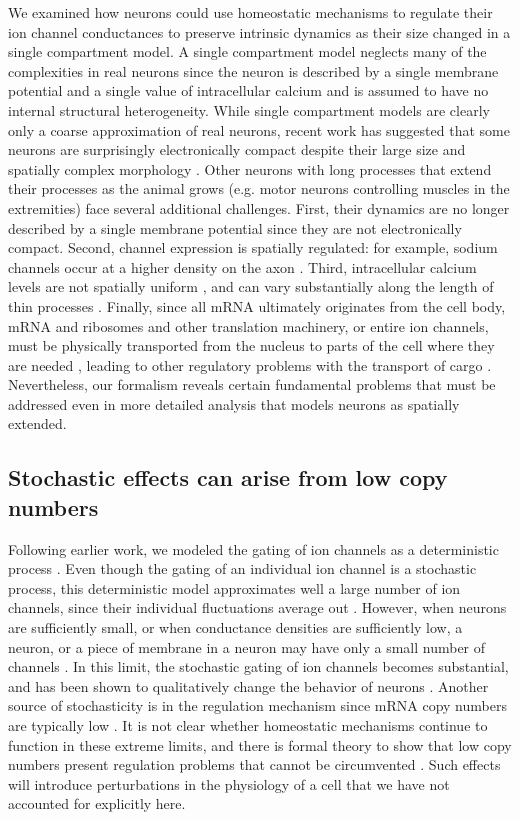 \documentclass[9pt,lineno]{elife}
\begin{document}
We examined how neurons could use homeostatic mechanisms to regulate their ion channel conductances to preserve intrinsic dynamics as their size changed in a single compartment model. A single compartment model neglects many of the complexities in real neurons since the neuron is described by a single membrane potential and a single value of intracellular calcium and is assumed to have no internal structural heterogeneity. While single compartment models are clearly only a coarse approximation of real neurons, recent work has suggested that some neurons are surprisingly electronically compact despite their large size and spatially complex morphology \citep{Otopalik:2017jr, Ray:2019fo}. Other neurons with long processes that extend their processes as the animal grows (e.g. motor neurons controlling muscles in the extremities) face several additional challenges. First, their dynamics are no longer described by a single membrane potential since they are not electronically compact. Second, channel expression is spatially regulated: for example, sodium channels occur at a higher density on the axon \citep{Kole:2008jv}. Third, intracellular calcium levels are not spatially uniform \citep{HernandezCruz:1990wv}, and can vary substantially along the length of thin processes \citep{Regehr:1994wg}. Finally, since all mRNA ultimately originates from the cell body, mRNA and ribosomes and other translation machinery, or entire ion channels, must be physically transported from the nucleus to parts of the cell where they are needed \citep{Doyle:2011be, Kosik:2016gs, Bramham:2007ii}, leading to other regulatory problems with the transport of cargo \citep{Doyle:2011be,Williams:2016cw}. Nevertheless, our formalism reveals certain fundamental problems that must be addressed even in more detailed analysis that models neurons as spatially extended.  


\subsection{Stochastic effects can arise from low copy numbers}
Following earlier work, we modeled the gating of ion channels as a deterministic process \citep{Hodgkin:1952gr}. Even though the gating of an individual ion channel is a stochastic process, this deterministic model approximates well a large number of ion channels, since their individual fluctuations average out  \citep{White:2000th}. However, when neurons are sufficiently small, or when conductance densities are sufficiently low, a neuron, or a piece of membrane in a neuron may have only a small number of channels \citep{Smith:2002cn}. In this limit, the stochastic gating of ion channels becomes substantial, and has been shown to qualitatively change the behavior of neurons  \citep{Chow:1996gz, Sengupta:2013ba}. Another source of stochasticity is in the regulation mechanism since mRNA copy numbers are typically low  \citep{Kosik:2016gs}. It is not clear whether homeostatic mechanisms continue to function in these extreme limits, and there is formal theory to show that low copy numbers present regulation problems that cannot be circumvented \citep{lestas2010fundamental}. Such effects will introduce perturbations in the physiology of a cell that we have not accounted for explicitly here.
\end{document}
